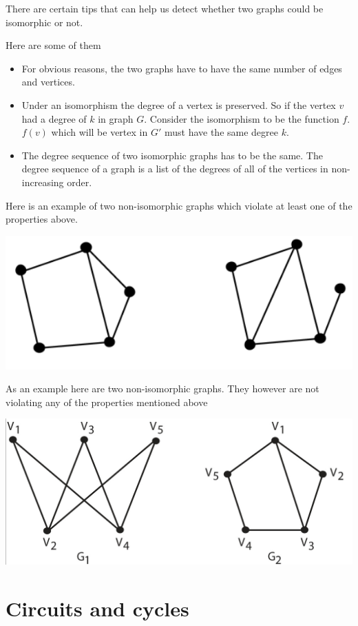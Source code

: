 \documentclass[12pt]{article}
\begin{document}
There are certain tips that can help us detect whether two graphs could be isomorphic or not.

Here are some of them

\begin{itemize}
\item For obvious reasons, the two graphs have to have the same number of edges and vertices.
\item Under an isomorphism the degree of a vertex is preserved. So if the vertex $v$ had a degree of $k$ in graph $G$. Consider the isomorphism to be the function $f$. $f(v)$ which will be vertex in $G'$ must have the same degree $k$.
\item The degree sequence of two isomorphic graphs has to be the same. The degree sequence of a graph is a list of the degrees of all of the vertices in non-increasing order.
\end{itemize}

Here is an example of two non-isomorphic graphs which violate at least one of the properties above.

\includegraphics[scale=0.5]{nonisodeg.png}


As an example here are two non-isomorphic graphs. They however are not violating any of the properties mentioned above

\includegraphics[scale=0.5]{noniso.png}


\section*{Circuits and cycles}
\end{document}
